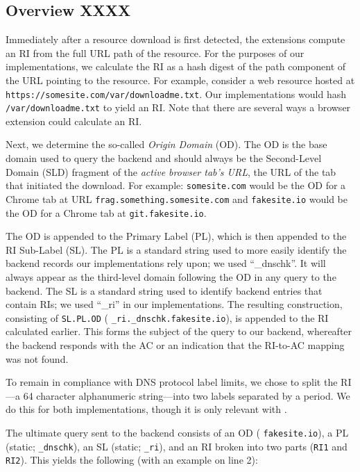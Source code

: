 \subsection{Overview XXXX}

Immediately after a resource download is first detected, the extensions compute
an RI from the full URL path of the resource. For the purposes of our
implementations, we calculate the RI as a hash digest of the path component of
the URL pointing to the resource. For example, consider a web resource hosted at
\texttt{https://somesite.com/var/downloadme.txt}. Our implementations would hash
\texttt{/var/downloadme.txt} to yield an RI. Note that there are several ways a
browser extension could calculate an RI.

Next, we determine the so-called \emph{Origin Domain} (OD). The OD is the base
domain used to query the backend and should always be the Second-Level Domain
(SLD) fragment of the \emph{active browser tab's URL}, \ie the URL of the tab
that initiated the download. For example: \texttt{somesite.com} would be the OD
for a Chrome tab at URL \texttt{frag.something.somesite.com} and
\texttt{fakesite.io} would be the OD for a Chrome tab at
\texttt{git.fakesite.io}.

The OD is appended to the Primary Label (PL), which is then appended to the RI
Sub-Label (SL). The PL is a standard string used to more easily identify the
backend records our implementations rely upon; we used ``\_dnschk''. It will
always appear as the third-level domain following the OD in any query to the
backend. The SL is a standard string used to identify backend entries that
contain RIs; we used ``\_ri'' in our implementations. The resulting
construction, consisting of \texttt{SL.PL.OD} (\eg
\texttt{\_ri.\_dnschk.fakesite.io}), is appended to the RI calculated earlier.
This forms the subject of the query to our backend, whereafter the backend
responds with the AC or an indication that the RI-to-AC mapping was not found.

To remain in compliance with DNS protocol label limits, we chose to split the
RI---a 64 character alphanumeric string---into two labels separated by a period.
We do this for both implementations, though it is only relevant with \DNSSYS{}.

The ultimate query sent to the backend consists of an OD (\eg
\texttt{fakesite.io}), a PL (static; \ie \texttt{\_dnschk}), an SL (static; \ie
\texttt{\_ri}), and an RI broken into two parts (\ie \texttt{RI1} and
\texttt{RI2}). This yields the following (with an example on line 2): \\

